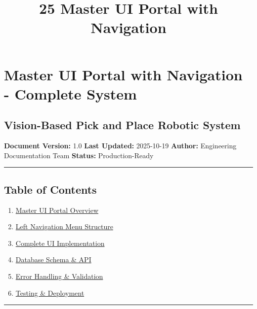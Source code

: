 \documentclass[
]{article}
\title{25 Master UI Portal with Navigation}
\author{}
\date{}
\providecommand{\tightlist}{%
  \setlength{\itemsep}{0pt}\setlength{\parskip}{0pt}}
\begin{document}
\maketitle

{
\setcounter{tocdepth}{3}
\tableofcontents
}
\hypertarget{master-ui-portal-with-navigation---complete-system}{%
\section{Master UI Portal with Navigation - Complete
System}\label{master-ui-portal-with-navigation---complete-system}}

\hypertarget{vision-based-pick-and-place-robotic-system}{%
\subsection{Vision-Based Pick and Place Robotic
System}\label{vision-based-pick-and-place-robotic-system}}

\textbf{Document Version:} 1.0 \textbf{Last Updated:} 2025-10-19
\textbf{Author:} Engineering Documentation Team \textbf{Status:}
Production-Ready

\begin{center}\rule{0.5\linewidth}{0.5pt}\end{center}

\hypertarget{table-of-contents}{%
\subsection{Table of Contents}\label{table-of-contents}}

\begin{enumerate}
\def\labelenumi{\arabic{enumi}.}
\tightlist
\item
  \protect\hyperlink{master-ui-portal-overview}{Master UI Portal
  Overview}
\item
  \protect\hyperlink{left-navigation-menu-structure}{Left Navigation
  Menu Structure}
\item
  \protect\hyperlink{complete-ui-implementation}{Complete UI
  Implementation}
\item
  \protect\hyperlink{database-schema--api}{Database Schema \& API}
\item
  \protect\hyperlink{error-handling--validation}{Error Handling \&
  Validation}
\item
  \protect\hyperlink{testing--deployment}{Testing \& Deployment}
\end{enumerate}

\begin{center}\rule{0.5\linewidth}{0.5pt}\end{center}
\end{document}
